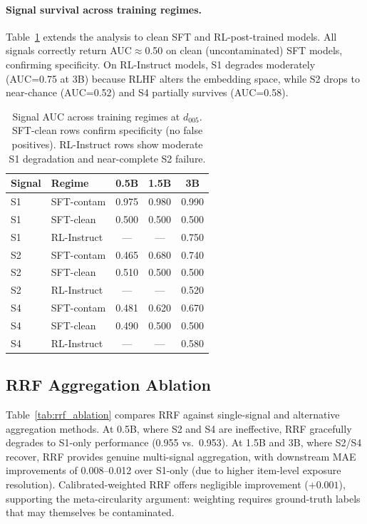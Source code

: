 \documentclass[11pt,a4paper]{article}
\begin{document}
\paragraph{Signal survival across training regimes.}
Table~\ref{tab:signal_regime} extends the analysis to clean SFT and RL-post-trained models. All signals correctly return AUC$\approx$0.50 on clean (uncontaminated) SFT models, confirming specificity. On RL-Instruct models, S1 degrades moderately (AUC=0.75 at 3B) because RLHF alters the embedding space, while S2 drops to near-chance (AUC=0.52) and S4 partially survives (AUC=0.58).

\begin{table}[t]
\centering
\caption{Signal AUC across training regimes at $d_{005}$. SFT-clean rows confirm specificity (no false positives). RL-Instruct rows show moderate S1 degradation and near-complete S2 failure.}
\label{tab:signal_regime}
\small
\begin{tabular}{llccc}
\toprule
Signal & Regime & 0.5B & 1.5B & 3B \\
\midrule
S1 & SFT-contam  & 0.975 & 0.980 & 0.990 \\
S1 & SFT-clean   & 0.500 & 0.500 & 0.500 \\
S1 & RL-Instruct & ---   & ---   & 0.750 \\
\midrule
S2 & SFT-contam  & 0.465 & 0.680 & 0.740 \\
S2 & SFT-clean   & 0.510 & 0.500 & 0.500 \\
S2 & RL-Instruct & ---   & ---   & 0.520 \\
\midrule
S4 & SFT-contam  & 0.481 & 0.620 & 0.670 \\
S4 & SFT-clean   & 0.490 & 0.500 & 0.500 \\
S4 & RL-Instruct & ---   & ---   & 0.580 \\
\bottomrule
\end{tabular}
\end{table}

\subsection{RRF Aggregation Ablation}
\label{sec:rrf}

Table~\ref{tab:rrf_ablation} compares RRF against single-signal and alternative aggregation methods. At 0.5B, where S2 and S4 are ineffective, RRF gracefully degrades to S1-only performance (0.955 vs.\ 0.953). At 1.5B and 3B, where S2/S4 recover, RRF provides genuine multi-signal aggregation, with downstream MAE improvements of 0.008--0.012 over S1-only (due to higher item-level exposure resolution). Calibrated-weighted RRF offers negligible improvement ($+0.001$), supporting the meta-circularity argument: weighting requires ground-truth labels that may themselves be contaminated.
\end{document}
